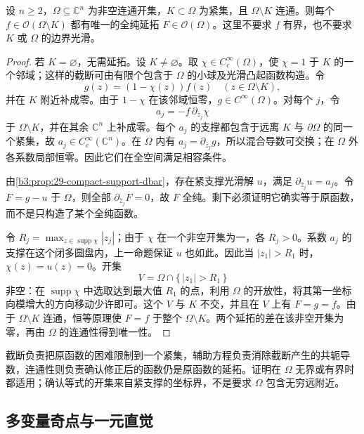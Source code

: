 \begin{theorem}\label{b3:thm:29-hartogs-compact}
设 \(n\ge2\)，\(\Omega\subseteq\mathbb C^n\) 为非空连通开集，\(K\subset\Omega\) 为紧集，且 \(\Omega\setminus K\) 连通。则每个 \(f\in\mathcal O(\Omega\setminus K)\) 都有唯一的全纯延拓 \(F\in\mathcal O(\Omega)\)。这里不要求 \(f\) 有界，也不要求 \(K\) 或 \(\Omega\) 的边界光滑。
\end{theorem}
\begin{proof}
若 \(K=\varnothing\)，无需延拓。设 \(K\ne\varnothing\)。取 \(\chi\in C_c^\infty(\Omega)\)，使 \(\chi=1\) 于 \(K\) 的一个邻域；这样的截断可由有限个包含于 \(\Omega\) 的小球及光滑凸起函数构造。令
\[
 g(z)=(1-\chi(z))f(z)\quad(z\in\Omega\setminus K),
\]
并在 \(K\) 附近补成零。由于 \(1-\chi\) 在该邻域恒零，\(g\in C^\infty(\Omega)\)。对每个 \(j\)，令
\[
 a_j=-f\,\partial_{\bar z_j}\chi
\]
于 \(\Omega\setminus K\)，并在其余 \(\mathbb C^n\) 上补成零。每个 \(a_j\) 的支撑都包含于远离 \(K\) 与 \(\partial\Omega\) 的同一个紧集，故 \(a_j\in C_c^\infty(\mathbb C^n)\)。在 \(\Omega\) 内有 \(a_j=\partial_{\bar z_j}g\)，所以混合导数可交换；在 \(\Omega\) 外各系数局部恒零。因此它们在全空间满足相容条件。

由\cref{b3:prop:29-compact-support-dbar}，存在紧支撑光滑解 \(u\)，满足 \(\partial_{\bar z_j}u=a_j\)。令 \(F=g-u\) 于 \(\Omega\)，则全部 \(\partial_{\bar z_j}F=0\)，故 \(F\) 全纯。剩下必须证明它确实等于原函数，而不是只构造了某个全纯函数。

令 \(R_j=\max_{z\in\operatorname{supp}\chi}|z_j|\)；由于 \(\chi\) 在一个非空开集为一，各 \(R_j>0\)。系数 \(a_j\) 的支撑在这个闭多圆盘内，上一命题保证 \(u\) 也如此。因此当 \(|z_1|>R_1\) 时，\(\chi(z)=u(z)=0\)。开集
\[
 V=\Omega\cap\{\,|z_1|>R_1\,\}
\]
非空：在 \(\operatorname{supp}\chi\) 中选取达到最大值 \(R_1\) 的点，利用 \(\Omega\) 的开放性，将其第一坐标向模增大的方向移动少许即可。这个 \(V\) 与 \(K\) 不交，并且在 \(V\) 上有 \(F=g=f\)。由于 \(\Omega\setminus K\) 连通，恒等原理使 \(F=f\) 于整个 \(\Omega\setminus K\)。两个延拓的差在该非空开集为零，再由 \(\Omega\) 的连通性得到唯一性。
\end{proof}

截断负责把原函数的困难限制到一个紧集，辅助方程负责消除截断产生的共轭导数，连通性则负责确认修正后的函数仍是原函数的延拓。证明在 \(\Omega\) 无界或有界时都适用；确认等式的开集来自紧支撑的坐标界，不是要求 \(\Omega\) 包含无穷远附近。

\subsection{多变量奇点与一元直觉}
\label{b3:subsec:290204}

